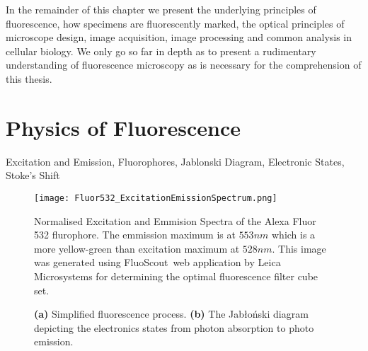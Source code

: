 In the remainder of this chapter we present the underlying principles of fluorescence, how specimens are fluorescently marked, the optical principles of microscope design, image acquisition, image processing and common analysis in cellular biology. We only go so far in depth as to present a rudimentary understanding of fluorescence microscopy as is necessary for the comprehension of this thesis.


\section{Physics of Fluorescence}
\label{sec:PhysicsOfFluorescence}

Excitation and Emission, Fluorophores, Jablonski Diagram, Electronic States, Stoke's Shift
\begin{figure}[!t]
	\centering
	\texttt{[image: Fluor532\_ExcitationEmissionSpectrum.png]}
	\caption{Normalised Excitation and Emmision Spectra of the Alexa Fluor 532 flurophore. The emmission maximum is at $553nm$ which is a more yellow-green than excitation maximum at $528nm$. This image was generated using FluoScout\texttrademark\, web application by Leica Microsystems for determining the optimal fluorescence filter cube set. %
	}
	\label{fig:excitationandemissionspectra}
\end{figure}

\begin{figure}[!t]
	\centering
	\caption{\textbf{(a)} Simplified fluorescence process. \textbf{(b)} The Jab{\l}o{\'n}ski diagram depicting the electronics states from photon absorption to photo emission.}
	\label{fig:thinkoflabel}
\end{figure}


